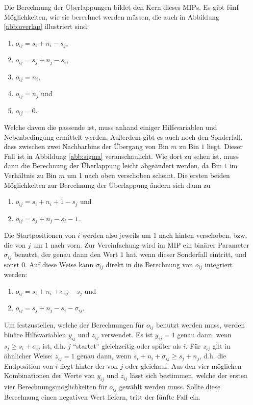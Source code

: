 \documentclass{scrreprt}
\begin{document}
Die Berechnung der Überlappungen bildet den Kern dieses MIPs.
Es gibt fünf Möglichkeiten, wie sie berechnet werden müssen, die auch in Abbildung \ref{abb:overlap} illustriert sind:
\begin{enumerate}
    \item $o_{ij} = s_i + n_i - s_j$,
    \item $o_{ij} = s_j + n_j - s_i$,
    \item $o_{ij} = n_i$,
    \item $o_{ij} = n_j$ und
    \item $o_{ij} = 0$.
\end{enumerate}
Welche davon die passende ist, muss anhand einiger Hilfsvariablen und Nebenbedingung ermittelt werden.
Außerdem gibt es auch noch den Sonderfall, dass zwischen zwei Nachbarbins der Übergang von Bin $m$ zu Bin $1$ liegt.
Dieser Fall ist in Abbildung \ref{abb:sigma} veranschaulicht.
Wie dort zu sehen ist, muss dann die Berechnung der Überlappung leicht abgeändert werden, da Bin $1$ im Verhältnis zu Bin $m$ um 1 nach oben verschoben scheint.
Die ersten beiden Möglichkeiten zur Berechnung der Überlappung ändern sich dann zu
\begin{enumerate}
    \item $o_{ij} = s_i + n_i + 1 - s_j$ und 
    \item $o_{ij} = s_j + n_j - s_i - 1$.
\end{enumerate}
Die Startpositionen von $i$ werden also jeweils um $1$ nach hinten verschoben, bzw. die von $j$ um $1$ nach vorn.
Zur Vereinfachung wird im MIP ein binärer Parameter $\sigma_{ij}$ benutzt, der genau dann den Wert $1$ hat, wenn dieser Sonderfall eintritt, und sonst $0$.
Auf diese Weise kann $\sigma_{ij}$ direkt in die Berechnung von $o_{ij}$ integriert werden:
\begin{enumerate}
    \item $o_{ij} = s_i + n_i + \sigma_{ij} - s_j$ und 
    \item $o_{ij} = s_j + n_j - s_i - \sigma_{ij}$.
\end{enumerate}

Um festzustellen, welche der Berechnungen für $o_{ij}$ benutzt werden muss, werden binäre Hilfsvariablen $y_{ij}$ und $z_{ij}$ verwendet.
Es ist $y_{ij}=1$ genau dann, wenn $s_j \geq s_i + \sigma_{ij}$ ist, d.h. $j$ "`startet"' gleichzeitig oder später als $i$.
Für $z_{ij}$ gilt in ähnlicher Weise: $z_{ij}=1$ genau dann, wenn $s_i + n_i + \sigma_{ij} \geq s_j + n_j$, 
d.h. die Endposition von $i$ liegt hinter der von $j$ oder gleichauf.
Aus den vier möglichen Kombinationen der Werte von $y_{ij}$ und $z_{ij}$ lässt sich bestimmen, 
welche der ersten vier Berechnungsmöglichkeiten für $o_{ij}$ gewählt werden muss.
Sollte diese Berechnung einen negativen Wert liefern, tritt der fünfte Fall ein.
\end{document}

